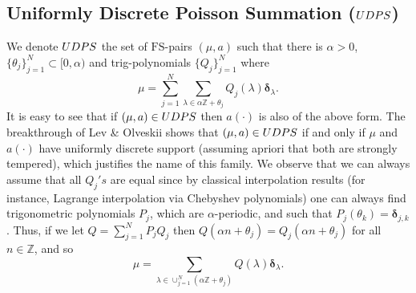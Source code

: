 \documentclass[a4paper,reqno,12pt]{amsart}
\newcommand{\z}{\mathbb{Z}}
\newcommand{\bo}{\boldsymbol}
\newcommand{\la}{\lambda}
\newcommand{\al}{\alpha}
\newcommand{\1}{{\bf 1}}
\newcommand{\fs}{\mathrm{FS}}
\newcommand{\udps}{{\rm UDPS}}
\renewcommand{\1}{{\bo 1}}
\newcommand{\del}{{\bo \delta}}
\renewcommand{\a}{a(\cdot)}
\begin{document}
\subsection{Uniformly Discrete Poisson Summation ($\udps$)} We denote $\udps$ the set of $\fs$-pairs $(\mu,a)$ such that there is $\al>0$, $\{\theta_j\}_{j=1}^N\subset [0,\alpha)$ and trig-polynomials $\{Q_j\}_{j=1}^N$ where
$$
\mu= \sum_{j=1}^N \sum_{\la \in \al \z+\theta_j} Q_j(\la) \del_\la.
$$
It is easy to see that if $(\mu,a)\in \udps$ then $\a$ is also of the above form. The breakthrough of Lev \& Olveskii \cite{LO2} shows that $(\mu,a)\in \udps$ if and only if $\mu$ and $\a$ have uniformly discrete support (assuming apriori that both are strongly tempered), which justifies the name of this family.  We observe  that we can always assume that all $Q_j's$ are equal since by classical interpolation results (for instance, Lagrange interpolation via Chebyshev polynomials) one can always find trigonometric polynomials $P_j$, which are $\alpha$-periodic, and such that $P_j(\theta_k)=\del_{j,k}$. Thus, if we let $Q = \sum_{j=1}^N P_j Q_j$ then $Q(\al n + \theta_j)=Q_j(\al n +\theta_j)$ for all $n\in \z$, and so
$$
\mu = \sum_{\la \in \cup_{j=1}^N (\al \z+\theta_j)} Q(\la) \del_\la.
$$
\end{document}
